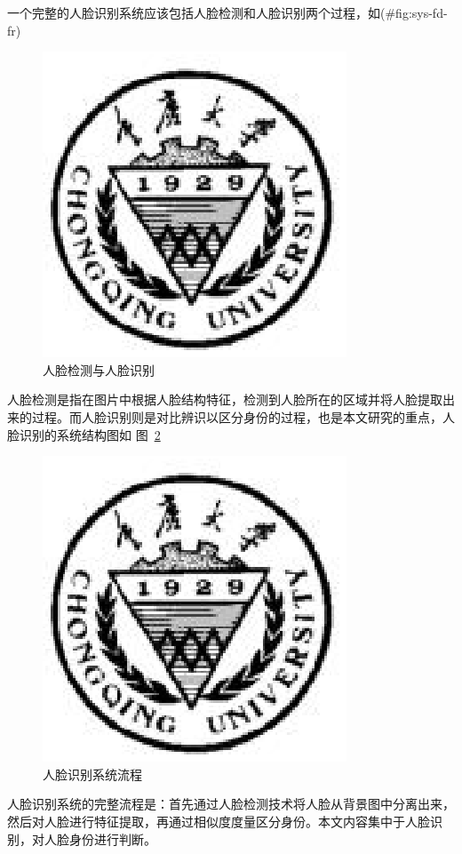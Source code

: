 \documentclass[bachelor,zhspacing]{cqu}  %
\begin{document}
一个完整的人脸识别系统应该包括人脸检测和人脸识别两个过程，如(\#fig:sys-fd-fr)

\begin{figure}[htbp]
\centering
\includegraphics{./pic/cqu.eps}
\caption{人脸检测与人脸识别}\label{fig:sys-fd-fr}
\end{figure}

人脸检测是指在图片中根据人脸结构特征，检测到人脸所在的区域并将人脸提取出来的过程。而人脸识别则是对比辨识以区分身份的过程，也是本文研究的重点，人脸识别的系统结构图如
图~\ref{fig:sys-constru}

\begin{figure}[htbp]
\centering
\includegraphics{./pic/cqu.eps}
\caption{人脸识别系统流程}\label{fig:sys-constru}
\end{figure}

人脸识别系统的完整流程是：首先通过人脸检测技术将人脸从背景图中分离出来，然后对人脸进行特征提取，再通过相似度度量区分身份。本文内容集中于人脸识别，对人脸身份进行判断。
\end{document}
